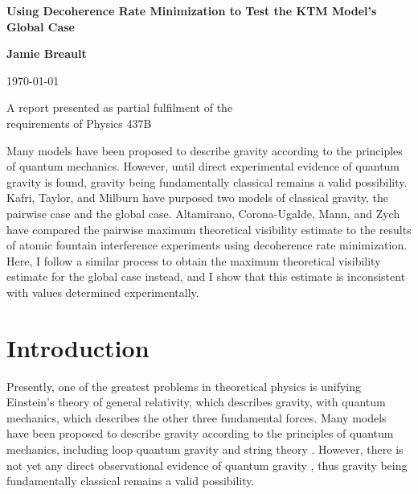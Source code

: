 \documentclass[aps, prd, superscriptaddress,twocolumn,amsmath,amssymb,nofootinbib]{revtex4-1}
\begin{document}
\begin{titlepage}
    \begin{center}
        \vspace*{3cm}
        
       \textbf{\huge Using Decoherence Rate Minimization to Test the KTM Model's Global Case}
               
        \vspace{1.5cm}
        \textbf{Jamie Breault}
        
        \today
        
        \vspace{1.5cm}
        A report presented as partial fulfilment of the\\
        requirements of Physics 437B 
        \vspace{3cm}
        \end{center}
        
        Many models have been proposed to describe gravity according to the principles of quantum mechanics. However, until direct experimental evidence of quantum gravity is found, gravity being fundamentally classical remains a valid possibility. Kafri, Taylor, and Milburn have purposed two models of classical gravity, the pairwise case and the global case. Altamirano, Corona-Ugalde, Mann, and Zych have compared the pairwise maximum theoretical visibility estimate to the results of atomic fountain interference experiments using decoherence rate minimization. Here, I follow a similar process to obtain the maximum theoretical visibility estimate for the global case instead, and I show that this estimate is inconsistent with values determined experimentally.
    
    \newpage
\end{titlepage}
\onecolumngrid
{}
\tableofcontents
\makeatletter
\let\toc@pre\relax
\let\toc@post\relax
\makeatother
\newpage
\listoffigures
\newpage
\onecolumngrid
\section{Introduction}
Presently, one of the greatest problems in theoretical physics is unifying Einstein's theory of general relativity, which describes gravity, with quantum mechanics, which describes the other three fundamental forces. Many models have been proposed to describe gravity according to the principles of quantum mechanics, including loop quantum gravity and string theory \cite{PI}. However, there is not yet any direct observational evidence of quantum gravity \cite{no_QG_evidence}, thus gravity being fundamentally classical remains a valid possibility.
\end{document}
